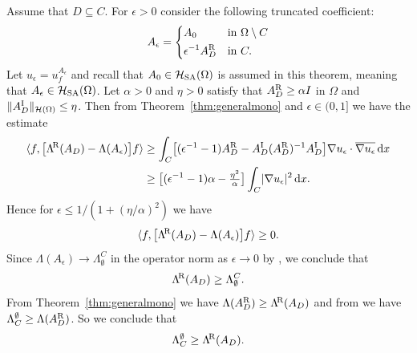 \documentclass[reqno]{amsart}
\numberwithin{equation}{section}
\numberwithin{figure}{section}
\numberwithin{table}{section}
\theoremstyle{plain}
\theoremstyle{definition}
\theoremstyle{remark}
\newcommand{\norm}[1]{\lVert#1\rVert}
\newcommand{\abs}[1]{\lvert#1\rvert}
\newcommand{\inner}[1]{\langle#1\rangle}
\newcommand{\di}{\mathrm{d}}   %
\newcommand{\upR}{^{\textup{R}}}
\newcommand{\upI}{^{\textup{I}}}
\newcommand{\uptR}{^{\!\textup{R}}}
\newcommand{\LambdaR}{\Lambda\uptR}
\newcommand{\AR}{A\upR}
\newcommand{\AI}{A\upI}
\newcommand{\Hsa}{\mathcal{H}_{\textup{SA}}}
\begin{document}
	Assume that $D\subseteq C$. For $\epsilon>0$ consider the following truncated coefficient:
	\begin{equation*}
		A_\epsilon = \begin{dcases}
			A_0 & \text{in } \Omega\setminus C \\
			\epsilon^{-1}\AR_D & \text{in } C.
		\end{dcases}
	\end{equation*}
	Let $u_\epsilon = u_f^{A_\epsilon}$ and recall that $A_0\in\Hsa(\Omega)$ is assumed in this theorem, meaning that $A_\epsilon\in\Hsa(\Omega)$. Let $\alpha>0$ and $\eta>0$ satisfy that $\AR_D\geq \alpha I$ in $\Omega$ and $\norm{\AI_D}_{\mathcal{H}(\Omega)}\leq \eta$. Then from Theorem~\ref{thm:generalmono} and $\epsilon\in(0,1]$ we have the estimate
	\begin{align*}
		\inner{f,\bigl[\LambdaR(A_D)-\Lambda(A_\epsilon)\bigr]f} &\geq \int_C \bigl[(\epsilon^{-1}-1)\AR_D - \AI_D(\AR_D)^{-1}\AI_D \bigr]\nabla u_\epsilon\cdot\overline{\nabla u_\epsilon}\,\di x \\
		&\geq \bigl[ (\epsilon^{-1}-1)\alpha - \tfrac{\eta^2}{\alpha}\bigr]\int_C \abs{\nabla u_\epsilon}^2\,\di x.
	\end{align*}
	Hence for $\epsilon \leq 1/(1 + (\eta/\alpha)^2)$ we have
	\begin{equation*}
		\inner{f,\bigl[\LambdaR(A_D)-\Lambda(A_\epsilon)\bigr]f} \geq 0.
	\end{equation*}
	Since $\Lambda(A_\epsilon) \to \Lambda_\emptyset^C$ in the operator norm as $\epsilon\to 0$ by \cite[theorem~13.3 and remark~13.4]{GJZ2025}, we conclude that 
	\begin{equation*}
		\LambdaR(A_D) \geq \Lambda_\emptyset^C.
	\end{equation*}
	From Theorem~\ref{thm:generalmono} we have $\Lambda(\AR_D) \geq \LambdaR(A_D)$ and from \cite[theorem~12.2]{GJZ2025} we have $\Lambda_C^\emptyset \geq \Lambda(\AR_D)$. So we conclude that
	\begin{equation*}
		\Lambda_C^\emptyset \geq \LambdaR(A_D).
	\end{equation*}
	
\end{document}
